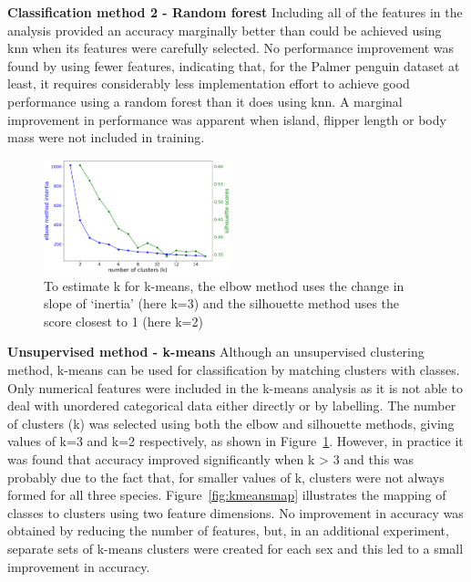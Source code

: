 \documentclass[12pt]{article}
\begin{document}
\textbf{Classification method 2 - Random forest}  
Including all of the features in the analysis provided an accuracy marginally better 
than could be achieved using knn when its features were carefully selected. 
No performance improvement was found by using fewer features, indicating that, for the Palmer penguin dataset at least, 
it requires considerably less implementation effort to achieve good performance using a random forest than it does using knn. 
A marginal improvement in performance was apparent when island, flipper length or body mass were not included in training.

\begin{figure} %
  \centering
  \vspace{-0.5\baselineskip} %
  \includegraphics[width=0.48\textwidth]{kmeansvalue.png} %
  \vspace{-0.5\baselineskip} %
  \caption{To estimate k for k-means, the elbow method uses the change in slope of ‘inertia’ (here k=3) and the silhouette method uses the score closest to 1 (here k=2)}
  \vspace{-0.5\baselineskip} %
  \label{fig:kmeansvalue}
\end{figure}

\textbf{Unsupervised method - k-means}  
Although an unsupervised clustering method, 
k-means can be used for classification by matching clusters with classes. 
Only numerical features were included in the k-means analysis as it is not able to deal 
with unordered categorical data either directly or by labelling. 
The number of clusters (k) was selected using both the elbow and silhouette methods, 
giving values of k=3 and k=2 respectively, as shown in Figure~\ref{fig:kmeansvalue}. 
However, in practice it was found that accuracy improved significantly when k > 3 
and this was probably due to the fact that, for smaller values of k, 
clusters were not always formed for all three species. 
Figure~\ref{fig:kmeansmap} illustrates the mapping of classes to clusters using two feature dimensions. 
No improvement in accuracy was obtained by reducing the number of features, 
but, in an additional experiment, separate sets of k-means clusters were created for each sex 
and this led to a small improvement in accuracy. 
\end{document}
